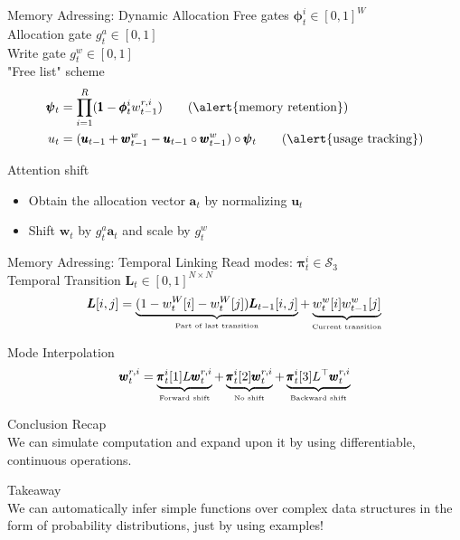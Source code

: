 \documentclass{beamer}
\begin{document}
\begin{frame}{Memory Adressing: Dynamic Allocation}
	\alert{Free gates} $\pmb{\phi}_t^i \in [0,1]^W$\\
	\alert{Allocation gate} $g_t^a \in [0,1]$\\
	\alert{Write gate} $g_t^w \in [0,1]$\\
	
	\alert{"Free list" scheme}
	\begin{align*}
	\pmb{\psi}_t &= \prod\limits_{i=1}^R (\pmb{1} - \pmb{\phi}_t^iw_{t-1}^{r,i}) \tag{\alert{memory retention}}\\
	u_t &= (\pmb{u}_{t-1} + \pmb{w}_{t-1}^w - \pmb{u}_{t-1} \circ \pmb{w}_{t-1}^w) \circ \pmb{\psi}_t \tag{\alert{usage tracking}}\\
	\end{align*}
	
	\pause
	\alert{Attention shift} 
	\begin{itemize}
	\item Obtain the \alert{allocation vector} $\pmb{a}_t$ by normalizing $\pmb{u}_t$\\
	\item \alert{Shift} $\pmb{w}_t$ by $g_t^a\pmb{a}_t$ and \alert{scale} by $g_t^w$
	\end{itemize}
\end{frame}

\begin{frame}{Memory Adressing: Temporal Linking}
	\alert{Read modes}: $\pmb{\pi}_t^i \in \mathcal{S}_3$\\
	
	\pause
	\alert{Temporal Transition} $\pmb{L}_t \in [0,1]^{N\times N}$
	\[
	\pmb{L}[i,j] = \underbrace{(1 - w_t^W[i] - w_t^W[j])\pmb{L}_{t-1}[i,j]}_{\text{\tiny{{Part of last transition}}}} + \underbrace{w_t^w[i]w_{t-1}^w[j]}_{\text{\tiny{Current transition}}}
	\]
	
	\pause
	\alert{Mode Interpolation}
	\[
	\pmb{w}_t^{r,i} = 
					\underbrace{\pmb{\pi}_t^i[1]L\pmb{w}_t^{r,i}}_{\text{\tiny{Forward shift}}} + 
					\underbrace{\pmb{\pi}_t^i[2]\pmb{w}_t^{r,i}}_{\text{\tiny{No shift}}} + 
					\underbrace{\pmb{\pi}_t^i[3]L^\top\pmb{w}_t^{r,i}}_{\text{\tiny{Backward shift}}} 
	\]
\end{frame}


\begin{frame}{Conclusion}
	\alert{Recap}\\
	We can simulate computation and expand upon it by using differentiable, continuous operations.
	
	\pause
	\alert{Takeaway}\\
	We can automatically infer simple functions over complex data structures in the form of \alert{probability distributions}, just by using examples!\\
\end{frame}
\end{document}
